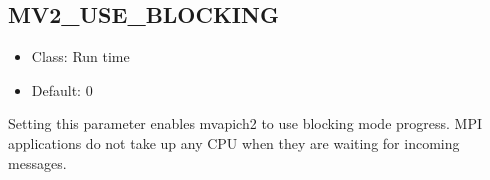 \subsection{MV2\_USE\_BLOCKING}
\begin{itemize}
    \item Class: Run time
    \item Default: 0
\end{itemize}
Setting this parameter enables mvapich2 to use blocking mode progress.
MPI applications do not take up any CPU when they are waiting for
incoming messages.


% 

%

